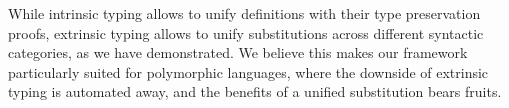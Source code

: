 \documentclass[a4paper, UKenglish, cleveref, autoref, thm-restate]{lipics-v2021}
\newenvironment{LibCode*}{%
  \begin{tcolorbox}[%
    colframe=white,%
    boxrule=0.0pt,%
    top=2.5pt,%
    left=2.5pt,%
    bottom=2.5pt,%
    right=2.5pt,%
    before skip=5pt,%
    after skip=5pt,%
    boxsep=0pt%
  ]
}{%
  \end{tcolorbox}%
}
\newcommand*\LibCode[1]{\begin{LibCode*}{#1}\end{LibCode*}}
\newcommand*\AppCode[1]{{#1}}
\begin{document}
  While intrinsic typing allows to unify definitions with their type
  preservation proofs, extrinsic typing allows to unify
  substitutions across different syntactic categories, as we have demonstrated.
  We believe this makes our framework particularly suited for polymorphic languages,
  where the downside of extrinsic typing is automated away, and the benefits
  of a unified substitution bears fruits.





  

  \clearpage





\end{document}
